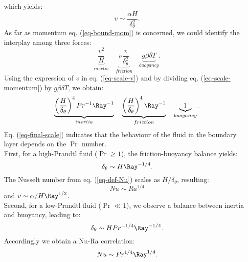 which yields:
\begin{equation} \label{eq-scale-v}
	v \sim \frac{\alpha H}{\delta_\theta^2}.
\end{equation}
As far as momentum eq. (\ref{eq-bound-mom}) is concerned, we could identify the interplay among three forces:
\begin{equation} \label{eq-scale-momentum}
	\underbrace{\frac{v^2}{H}}_{inertia} \quad \underbrace{\nu \frac{v}{\delta_\theta^2}}_{friction} \quad \underbrace{g \beta \delta T}_{buoyancy}.
\end{equation}
Using the expression of $v$ in eq. (\ref{eq-scale-v}) and by dividing eq. (\ref{eq-scale-momentum}) by $g \beta \delta T$, we obtain:
\begin{equation} \label{eq-final-scale}
	\underbrace{\left( \frac{H}{\delta_\theta} \right)^4 Pr ^{-1} \Ray^{-1}}_{inertia} \quad  \underbrace{\left( \frac{H}{\delta_\theta} \right)^4 \Ray^{-1}}_{friction} \quad \underbrace{1}_{buoyancy}.
\end{equation}
Eq. (\ref{eq-final-scale}) indicates that the behaviour of the fluid in the boundary layer depends on the $\Pr$ number. \\
First, for a high-Prandtl fluid ($\Pr \geq 1$), the friction-buoyancy balance yields: 
\begin{equation}
	\delta_\theta \sim H \Ray^{-1/4}.
\end{equation}
The Nusselt number from eq. (\ref{eq-def-Nu}) scales as $H/\delta_\theta$, resulting: 
\begin{equation}
	N\!u \sim Ra^{1/4}
\end{equation}
and $v \sim \alpha/H \Ray^{1/2}$. \\
Second, for a low-Prandtl fluid ($\Pr \ll 1$), we observe a balance between inertia and buoyancy, leading to:
\begin{equation} \label{eq-corr-Low-Pr}
	\delta_\theta \sim H Pr^{-1/4} \Ray^{-1/4}.
\end{equation}
Accordingly we obtain a Nu-Ra correlation:
\begin{equation}
	Nu \sim Pr^{1/4} \Ray^{1/4}.
\end{equation}




%
%
%

